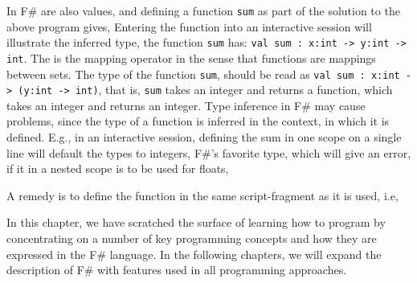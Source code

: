 In F\#  are also values, and defining a function \lstinline|sum| as part of the solution to the above program gives,
%
%
Entering the function into an interactive session will illustrate the inferred type, the function \lstinline|sum| has: \lstinline{val sum : x:int -> y:int -> int}. The \lexeme{->} is the mapping operator in the sense that functions are mappings between sets. The type of the function \lstinline{sum}, should be read as \lstinline{val sum : x:int -> (y:int -> int)}, that is, \lstinline|sum| takes an integer and returns a function, which takes an integer and returns an integer. Type inference in F\# may cause problems, since the type of a function is inferred in the context, in which it is defined. E.g., in an interactive session, defining the sum in one scope on a single line will default the types to integers, F\#'s favorite type, which will give an error, if it in a nested scope is to be used for floats,
%




A remedy is to define the function in the same script-fragment as it is used, i.e,
%


In this chapter, we have scratched the surface of learning how to program by concentrating on a number of key programming concepts and how they are expressed in the F\# language. In the following chapters, we will expand the description of F\# with features used in all programming approaches.

